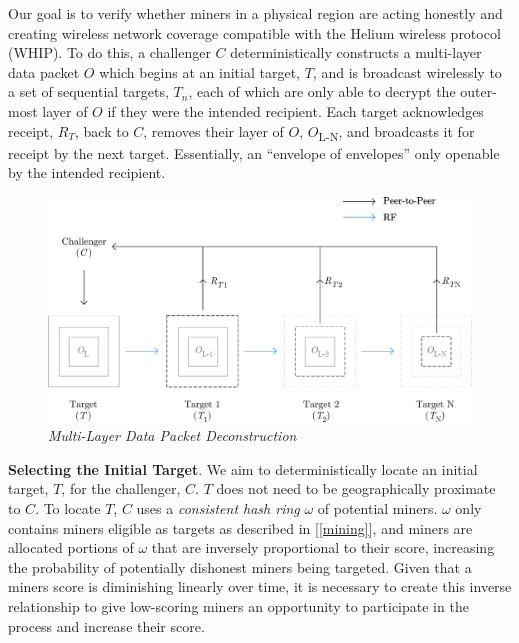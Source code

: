 \documentclass[letterpaper,11pt]{article}
\begin{document}
Our goal is to verify whether miners in a physical region are acting honestly and creating wireless network coverage compatible with the Helium wireless protocol (WHIP). To do this, a challenger $C$ deterministically constructs a multi-layer data packet $O$ which begins at an initial target, $T$, and is broadcast wirelessly to a set of sequential targets, $T_n$, each of which are only able to decrypt the outer-most layer of $O$ if they were the intended recipient. Each target acknowledges receipt, $R_T$, back to $C$, removes their layer of $O$, $O$\textsubscript{L-N}, and broadcasts it for receipt by the next target. Essentially, an ``envelope of envelopes'' only openable by the intended recipient.

\begin{figure}[H]
    \begin{center}
          \includegraphics[width=\textwidth]{diagram2.eps}
          \caption{\emph{Multi-Layer Data Packet Deconstruction}}
          \label{fig:poc-construction}
     \end{center}
\end{figure}

\textbf{Selecting the Initial Target}. We aim to deterministically locate an initial target, $T$, for the challenger, $C$. $T$ does not need to be geographically proximate to $C$. To locate $T$, $C$ uses a \emph{consistent hash ring} $\omega$ of potential miners. $\omega$ only contains miners eligible as targets as described in [\ref{mining}], and miners are allocated portions of $\omega$ that are inversely proportional to their score, increasing the probability of potentially dishonest miners being targeted. Given that a miners score is diminishing linearly over time, it is necessary to create this inverse relationship to give low-scoring miners an opportunity to participate in the process and increase their score.
\end{document}
